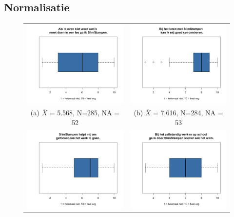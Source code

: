 \documentclass[12pt, a4paper]{article}
\begin{document}
\subsection{Normalisatie}
\begin{figure}
    \begin{tabular}{cc}
      \includegraphics[width=65mm]{11-AlsIkNietWeetGaSlimstampen.png} &   \includegraphics[width=65mm]{13-ConcentratieBijSlimStampen.png} \\
    (a)  $\overline{X}$ = 5.568, N=285, NA = 52 & (b) $\overline{X}$ = 7.616, N=284, NA = 53 \\[6pt]
     \includegraphics[width=65mm]{17-GefocustAanHetWerk.png} &   \includegraphics[width=65mm]{18-SnellerAanHetWerk.png} \\

\end{tabular}
\end{figure}
\end{document}
